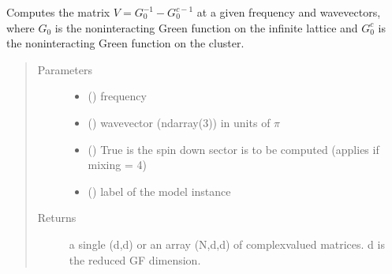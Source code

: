 \documentclass[letterpaper,10pt,english]{sphinxmanual}
\begin{document}

\begin{fulllineitems}
\label{\detokenize{functions:pyqcm.TooManyIterationsError}}
\end{fulllineitems}


\begin{fulllineitems}
\label{\detokenize{functions:pyqcm.V_matrix}}
\sphinxAtStartPar
Computes the matrix \(V=G_0^{-1}-G^{c-1}_0\) at a given frequency and wavevectors, where \(G_0\) is the noninteracting Green function on the infinite lattice and \(G^c_0\) is the noninteracting Green function on the cluster.
\begin{quote}\begin{description}
\item[{Parameters}] \leavevmode\begin{itemize}
\item {} 
\sphinxAtStartPar
{} () \textendash{} frequency

\item {} 
\sphinxAtStartPar
{} () \textendash{} wavevector (ndarray(3)) in units of \(\pi\)

\item {} 
\sphinxAtStartPar
{} () \textendash{} True is the spin down sector is to be computed (applies if mixing = 4)

\item {} 
\sphinxAtStartPar
{} () \textendash{} label of the model instance

\end{itemize}

\item[{Returns}] \leavevmode
\sphinxAtStartPar
a single (d,d) or an array (N,d,d) of complex\sphinxhyphen{}valued matrices. d is the reduced GF dimension.

\end{description}\end{quote}

\end{fulllineitems}
\end{document}
